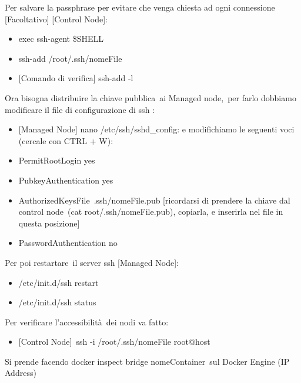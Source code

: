 \documentclass[
]{article}
\providecommand{\tightlist}{%
  \setlength{\itemsep}{0pt}\setlength{\parskip}{0pt}}
\begin{document}
{Per salvare la passphrase per evitare che venga chiesta ad ogni
connessione }{{[}Facoltativo{]} {[}Control Node{]}}{:}

\begin{itemize}
\tightlist
\item
  {exec ssh-agent \$SHELL}
\item
  {ssh-add /root/.ssh/nomeFile}
\item
  {{[}Comando di verifica{]} }{ssh-add -l }
\end{itemize}

{}

{Ora bisogna }{distribuire la chiave pubblica}{~ai Managed }{node,}{~per
farlo dobbiamo modificare il file di configurazione di ssh :}

\begin{itemize}
\tightlist
\item
  {{[}Managed Node{]} }{nano /etc/ssh/sshd\_config}{: e modifichiamo le
  seguenti voci (cercale con CTRL + W):}
\end{itemize}

\begin{itemize}
\tightlist
\item
  {PermitRootLogin yes}
\item
  {PubkeyAuthentication yes}
\item
  {AuthorizedKeysFile}{~.ssh/nomeFile.pub }{{[}ricordarsi di prendere la
  chiave dal control }{node}{~(cat root/.ssh/nomeFile.pub), copiarla, e
  inserirla nel file in questa posizione{]}}
\item
  {PasswordAuthentication no}
\end{itemize}

{Per poi }{restartare}{~}{il server ssh }{{[}Managed Node{]}}{:}

\begin{itemize}
\tightlist
\item
  {/etc/init.d/ssh restart}
\item
  {/etc/init.d/ssh status}
\end{itemize}

{}

{Per }{verificare l'accessibilità}{~dei nodi va fatto:}

\begin{itemize}
\tightlist
\item
  {{[}Control Node{]}}{~}{ssh -i /root/.ssh/nomeFile root@}{host}
\end{itemize}

{Si prende facendo }{docker inspect bridge }{nomeContainer}{~sul Docker
Engine (IP Address)}
\end{document}
